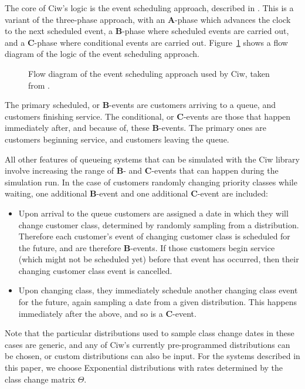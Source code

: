 \documentclass{article}
\begin{document}
The core of Ciw's logic is the event scheduling approach, described in
\cite{robinson14}. This is a variant of the three-phase approach, with an
\textbf{A}-phase which advances the clock to the next scheduled event, a
\textbf{B}-phase where scheduled events are carried out, and a \textbf{C}-phase
where conditional events are carried out. Figure~\ref{fig:eventscheduling} shows
a flow diagram of the logic of the event scheduling approach.

\begin{figure}
    \centering
    
    \caption{Flow diagram of the event scheduling approach used by Ciw, taken from \cite{palmer18}.}
    \label{fig:eventscheduling}
\end{figure}

The primary scheduled, or \textbf{B}-events are customers arriving to a queue,
and customers finishing service. The conditional, or \textbf{C}-events are those
that happen immediately after, and because of, these \textbf{B}-events. The
primary ones are customers beginning service, and customers leaving the queue.

All other features of queueing systems that can be simulated with the Ciw
library involve increasing the range of \textbf{B}- and \textbf{C}-events that
can happen during the simulation run.
In the case of customers randomly changing priority classes while waiting, one
additional \textbf{B}-event and one additional \textbf{C}-event are included:

\begin{itemize}
  \item Upon arrival to the queue customers are assigned a date in which they
  will change customer class, determined by randomly sampling from a
  distribution. Therefore each customer's event of changing customer class is
  scheduled for the future, and are therefore \textbf{B}-events. If those
  customers begin service (which might not be scheduled yet) before that event
  has occurred, then their changing customer class event is cancelled.
  \item Upon changing class, they immediately schedule another changing class
  event for the future, again sampling a date from a given distribution. This
  happens immediately after the above, and so is a \textbf{C}-event.
\end{itemize}

Note that the particular distributions used to sample class change dates in
these cases are generic, and any of Ciw's currently pre-programmed distributions
can be chosen, or custom distributions can also be input. For the systems
described in this paper, we choose Exponential distributions with rates
determined by the class change matrix $\Theta$.
\end{document}

